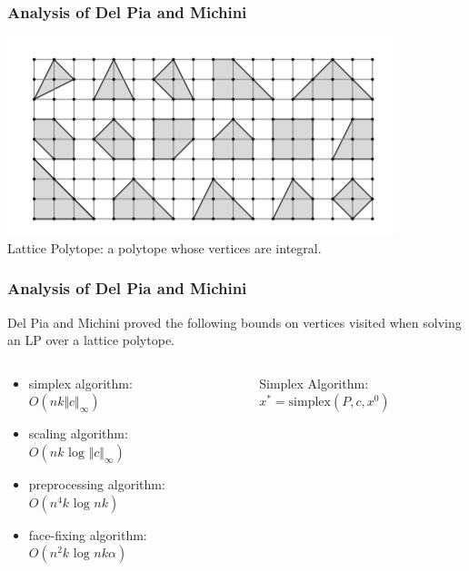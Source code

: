 \documentclass{beamer}
\begin{document}
\begin{frame}
	\frametitle{Analysis of Del Pia and Michini}
	\begin{center}
		\includegraphics[]{lattice.png} \\
		Lattice Polytope: a polytope whose vertices are integral.
	\end{center}
\end{frame}

\begin{frame}
	\frametitle{Analysis of Del Pia and Michini}
	Del Pia and Michini proved the following bounds on vertices visited when solving an LP over a lattice polytope.
	\begin{columns}[T]
		\begin{column}{.5\textwidth}
			\begin{itemize}
				\item simplex algorithm: \\
				$O(nk \Vert c \Vert_\infty)$
				\item scaling algorithm: \\
				$O(nk \text{ log } \Vert c \Vert_\infty)$
				\item preprocessing algorithm: \\
				$O(n^4k \text{ log } nk)$
				\item face-fixing algorithm: \\
				$O(n^2k \text{ log } nk\alpha)$
			\end{itemize}
		\end{column}
		\begin{column}{.5\textwidth}
			Simplex Algorithm: \\
			$x^* = \text{simplex}(P, c, x^0)$
		\end{column}
	\end{columns}
\end{frame}
\end{document}
